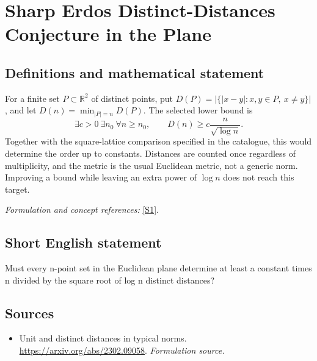 \documentclass[11pt]{article}
\begin{document}
\section*{\texorpdfstring{Sharp Erdos Distinct-Distances Conjecture in the Plane}{Sharp Erdos Distinct-Distances Conjecture in the Plane}}\label{statement}
\subsection{Definitions and mathematical statement}
For a finite set $P\subset{\mathbb{R}}^2$ of distinct points, put
$D(P)=|\{|x-y|:x,y\in P,\ x\ne y\}|$, and let
$D(n)=\min_{|P|=n}D(P)$. The selected lower bound is
\[
 \exists c>0\ \exists n_0\ \forall n\ge n_0,
 \qquad D(n)\ge c\frac{n}{\sqrt{\log n}}.
\]
Together with the square-lattice comparison specified in the catalogue, this would determine the order up to constants. Distances are counted once regardless of multiplicity, and the metric is the usual Euclidean metric, not a generic norm. Improving a bound while leaving an extra power of $\log n$ does not reach this target.
\par\smallskip\textit{Formulation and concept references:} \href{https://arxiv.org/abs/2302.09058}{[S1]}.

\subsection{Short English statement}
Must every n-point set in the Euclidean plane determine at least a constant times n divided by the square root of log n distinct distances?
\subsection{Sources}
\begin{itemize}
\item[S1]Unit and distinct distances in typical norms.
\url{https://arxiv.org/abs/2302.09058}.
\textit{Formulation source.}
\end{itemize}
\end{document}
